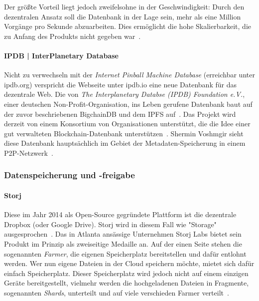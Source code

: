 Der größte Vorteil liegt jedoch zweifelsohne in der Geschwindigkeit: Durch den dezentralen Ansatz soll die Datenbank in der Lage sein, mehr als eine Million Vorgänge pro Sekunde abzuarbeiten. Dies ermöglicht die hohe Skalierbarkeit, die zu Anfang des Produkts nicht gegeben war~\cite{Schmiechen.2016}. 


\paragraph{IPDB | InterPlanetary Database}

Nicht zu verwechseln mit der \textit{Internet Pinball Machine Database} (erreichbar unter ipdb.org) verspricht die Webseite unter ipdb.io eine neue Datenbank für das dezentrale Web. Die von \textit{The Interplanetary Databse (IPDB) Foundation e.V.}, einer deutschen Non-Profit-Organisation, ins Leben gerufene Datenbank baut auf der zuvor beschriebenen BigchainDB und dem IPFS auf~\cite{IPDB.2018}. Das Projekt wird derzeit von einem Konsortium von Organisationen unterstützt, die die Idee einer gut verwalteten Blockchain-Datenbank unterstützen~\cite{IPDB.2018}. Shermin Voshmgir sieht diese Datenbank hauptsächlich im Gebiet der Metadaten-Speicherung in einem P2P-Netzwerk~\cite[S. 29]{Voshmgir.2019}. 


\subsubsection{Datenspeicherung und -freigabe}

\paragraph{Storj}

Diese im Jahr 2014 als Open-Source gegründete Plattform ist die dezentrale Dropbox (oder Google Drive). Storj wird in diesem Fall wie "Storage" ausgesprochen~\cite{Blockchainwelt.2019}. Das in Atlanta ansässige Unternehmen Storj Labs bietet sein Produkt im Prinzip als zweiseitige Medaille an. Auf der einen Seite stehen die sogenannten \textit{Farmer}, die eigenen Speicherplatz bereitstellen und dafür entlohnt werden. Wer nun eigene Dateien in der Cloud speichern möchte, mietet sich dafür einfach Speicherplatz. Dieser Speicherplatz wird jedoch nicht auf einem einzigen Geräte bereitgestellt, vielmehr werden die hochgeladenen Dateien in Fragmente, sogenannten \textit{Shards}, unterteilt und auf viele verschieden Farmer verteilt~\cite{Blockchainwelt.2019}. 


